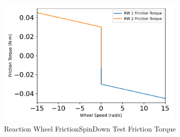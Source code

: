 \begin{figure}[htbp]\centerline{\includegraphics[width=0.8\textwidth]{AutoTeX/ReactionWheelFrictionSpinDownTestFrictionTorque}}\caption{Reaction Wheel FrictionSpinDown Test Friction Torque}\label{fig:ReactionWheelFrictionSpinDownTestFrictionTorque}\end{figure}
